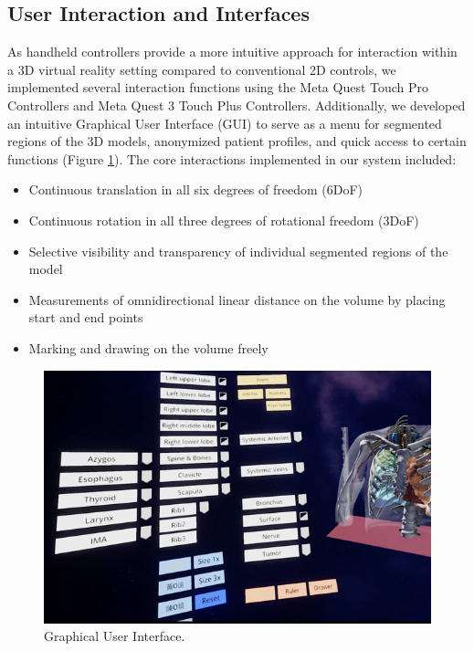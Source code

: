 \documentclass[sn-mathphys-num]{sn-jnl}%
\theoremstyle{thmstyleone}%
\theoremstyle{thmstyletwo}%
\theoremstyle{thmstylethree}%
\begin{document}
\subsection{User Interaction and Interfaces}
As handheld controllers provide a more intuitive approach for interaction within a 3D virtual reality setting compared to conventional 2D controls, we implemented several interaction functions using the Meta Quest Touch Pro Controllers and Meta Quest 3 Touch Plus Controllers. Additionally, we developed an intuitive Graphical User Interface (GUI) to serve as a menu for segmented regions of the 3D models, anonymized patient profiles, and quick access to certain functions (Figure \ref{fig:GUI}). The core interactions implemented in our system included:
\begin{itemize}
  \item Continuous translation in all six degrees of freedom (6DoF)
  \item Continuous rotation in all three degrees of rotational freedom (3DoF)
  \item Selective visibility and transparency of individual segmented regions of the model
  \item Measurements of omnidirectional linear distance on the volume by placing start and end points
  \item Marking and drawing on the volume freely
\end{itemize}
\begin{figure}
  \centering
  \includegraphics[width=.9\linewidth]{../Media/GUI}  
  \caption{Graphical User Interface.}
  \label{fig:GUI}
\end{figure}
\end{document}

